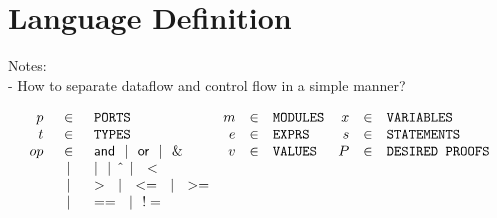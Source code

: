 \documentclass[10pt]{article}
\newcommand{\alt}{~~|~~}
\newcommand{\andop}        {\mathsf{and}}
\newcommand{\orop}         {\mathsf{or}}
\begin{document}
\section{Language Definition}

Notes: \\
- How to separate dataflow and control flow in a simple manner?

\[
	\begin{array}{rclrclrcl}
		p  & \in  & \verb|PORTS|              & m & \in & \verb|MODULES| & x & \in & \verb|VARIABLES|      \\
		t  & \in  & \verb|TYPES|              & e & \in & \verb|EXPRS|   & s & \in & \verb|STATEMENTS|     \\
		op & \in  & \andop \alt \orop \alt \& & v & \in & \verb|VALUES|  & P & \in & \verb|DESIRED PROOFS| \\
		   & \alt & | \alt \hat{} \alt <      &   &     &                &   &                             \\
		   & \alt & > \alt <= \alt >=         &   &     &                &   &                             \\
		   & \alt & == \alt !=                &   &     &                &   &                             \\
	\end{array}
\]
\end{document}
